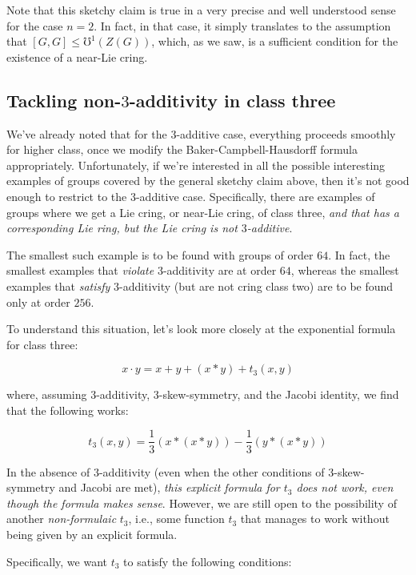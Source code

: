 \documentclass[10pt]{amsart}
\begin{document}
Note that this sketchy claim is true in a very precise and well
understood sense for the case $n = 2$. In fact, in that case, it
simply translates to the assumption that $[G,G] \le \mho^1(Z(G))$,
which, as we saw, is a sufficient condition for the existence of a
near-Lie cring.

\subsection{Tackling non-$3$-additivity in class three}

We've already noted that for the $3$-additive case, everything
proceeds smoothly for higher class, once we modify the
Baker-Campbell-Hausdorff formula appropriately. Unfortunately, if
we're interested in all the possible interesting examples of groups
covered by the general sketchy claim above, then it's not good enough
to restrict to the $3$-additive case. Specifically, there are examples
of groups where we get a Lie cring, or near-Lie cring, of class three,
{\em and that has a corresponding Lie ring, but the Lie cring is not
$3$-additive}.

The smallest such example is to be found with groups of order $64$. In
fact, the smallest examples that {\em violate} $3$-additivity are at
order $64$, whereas the smallest examples that {\em satisfy}
$3$-additivity (but are not cring class two) are to be found only at
order $256$.

To understand this situation, let's look more closely at the
exponential formula for class three:

$$x \cdot y = x + y + (x * y) + t_3(x,y)$$

where, assuming $3$-additivity, $3$-skew-symmetry, and the Jacobi
identity, we find that the following works:

$$t_3(x,y) = \frac{1}{3}(x * (x * y)) - \frac{1}{3}(y * (x * y))$$

In the absence of $3$-additivity (even when the other conditions of
$3$-skew-symmetry and Jacobi are met), {\em this explicit formula for
$t_3$ does not work, even though the formula makes sense}. However, we
are still open to the possibility of another {\em non-formulaic}
$t_3$, i.e., some function $t_3$ that manages to work without being
given by an explicit formula.

Specifically, we want $t_3$ to satisfy the following conditions:
\end{document}
